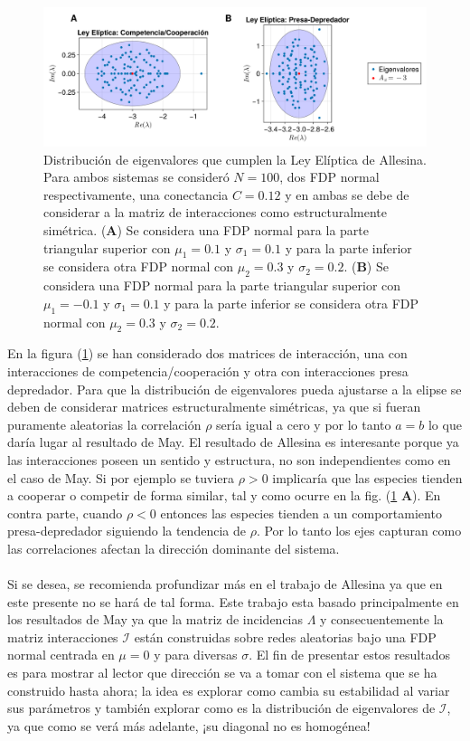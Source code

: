 \begin{figure}[h!]
	\centering
	\includegraphics[scale=0.2]{../Imagenes/LeyElipticaAllesina}
	\caption{Distribución de eigenvalores que cumplen la Ley Elíptica de Allesina. Para ambos sistemas se consideró $N=100$, dos FDP normal respectivamente, una conectancia $C=0.12$ y en ambas se debe de considerar a la matriz de interacciones como estructuralmente simétrica. (\textbf{A}) Se considera una FDP normal para la parte triangular superior con $\mu_1=0.1$ y $\sigma_1 = 0.1$ y para la parte inferior se considera otra FDP normal con $\mu_2=0.3$ y $\sigma_2 = 0.2$. (\textbf{B}) Se considera una FDP normal para la parte triangular superior con $\mu_1=-0.1$ y $\sigma_1=0.1$ y para la parte inferior se considera otra FDP normal con $\mu_2=0.3$ y $\sigma_2=0.2$. }
	\label{fig:LeyElipticaAllesina}
\end{figure}
En la figura (\ref{fig:LeyElipticaAllesina}) se han considerado dos matrices de interacción, una con interacciones de competencia/cooperación y otra con interacciones presa depredador. Para que la distribución de eigenvalores pueda ajustarse a la elipse se deben de considerar matrices estructuralmente simétricas, ya que si fueran puramente aleatorias la correlación $\rho$ sería igual a cero y por lo tanto $a=b$ lo que daría lugar al resultado de May. El resultado de Allesina es interesante porque ya las interacciones poseen un sentido y estructura, no son independientes como en el caso de May. Si por ejemplo se tuviera $\rho>0$ implicaría que las especies tienden a cooperar o competir de forma similar, tal y como ocurre en la fig. (\ref{fig:LeyElipticaAllesina} \textbf{A}). En contra parte, cuando $\rho <0$ entonces las especies tienden a un comportamiento presa-depredador siguiendo la tendencia de $\rho$. Por lo tanto los ejes capturan como las correlaciones afectan la dirección dominante del sistema. \\
\\
Si se desea, se recomienda profundizar más en el trabajo de Allesina ya que en este presente no se hará de tal forma. Este trabajo esta basado principalmente en los resultados de May ya que la matriz de incidencias $\Lambda$ y consecuentemente la matriz interacciones $\mathcal{I}$ están construidas sobre redes aleatorias bajo una FDP normal centrada en $\mu=0$ y para diversas $\sigma$. El fin de presentar estos resultados es para mostrar al lector que dirección se va a tomar con el sistema que se ha construido  hasta ahora; la idea es explorar como cambia su estabilidad al variar sus parámetros y también explorar como es la distribución de eigenvalores de $\mathcal{I}$, ya que como se verá más adelante, ¡su diagonal no es homogénea!

